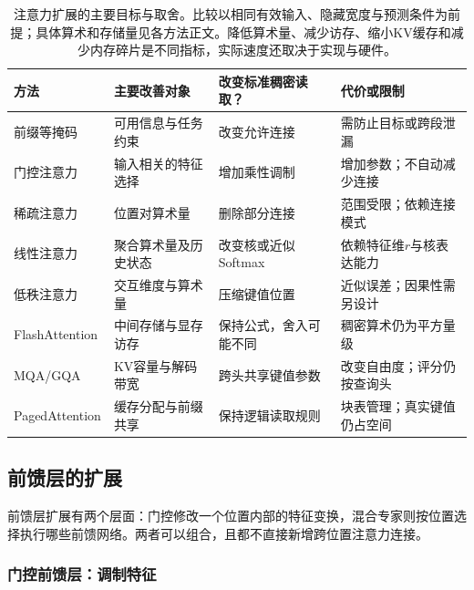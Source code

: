 \begin{table}[htbp]
  \centering
  \small
  \begin{tabular}{@{}p{30mm}p{37mm}p{39mm}p{49mm}@{}}
    \toprule
    方法 & 主要改善对象 & 改变标准稠密读取？ & 代价或限制 \\
    \midrule
    前缀等掩码 & 可用信息与任务约束 & 改变允许连接 & 需防止目标或跨段泄漏 \\
    门控注意力 & 输入相关的特征选择 & 增加乘性调制 & 增加参数；不自动减少连接 \\
    稀疏注意力 & 位置对算术量 & 删除部分连接 & 范围受限；依赖连接模式 \\
    线性注意力 & 聚合算术量及历史状态 & 改变核或近似Softmax & 依赖特征维$r$与核表达能力 \\
    低秩注意力 & 交互维度与算术量 & 压缩键值位置 & 近似误差；因果性需另设计 \\
    FlashAttention & 中间存储与显存访存 & 保持公式，舍入可能不同 & 稠密算术仍为平方量级 \\
    MQA/GQA & KV容量与解码带宽 & 跨头共享键值参数 & 改变自由度；评分仍按查询头 \\
    PagedAttention & 缓存分配与前缀共享 & 保持逻辑读取规则 & 块表管理；真实键值仍占空间 \\
    \bottomrule
  \end{tabular}
  \caption{注意力扩展的主要目标与取舍。比较以相同有效输入、隐藏宽度与预测条件为前提；具体算术和存储量见各方法正文。降低算术量、减少访存、缩小KV缓存和减少内存碎片是不同指标，实际速度还取决于实现与硬件。}
  \label{tab:transformer-attention-extensions}
\end{table}
\FloatBarrier

\subsection{前馈层的扩展}
\label{sec:transformer-ffn-extensions}

前馈层扩展有两个层面：门控修改一个位置内部的特征变换，混合专家则按位置选择执行哪些前馈网络。两者可以组合，且都不直接新增跨位置注意力连接。

\subsubsection{门控前馈层：调制特征}

